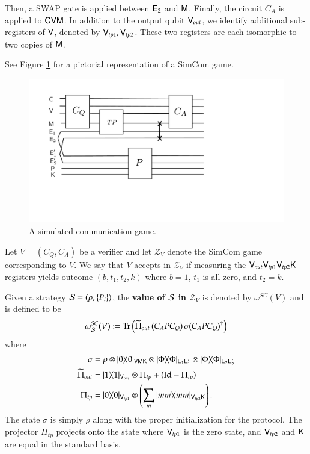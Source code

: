 Then, a SWAP gate is applied between ${\mathsf{E}}_2$ and ${\mathsf{M}}$. Finally, the circuit $C_A$ is applied to ${\mathsf{C}} {\mathsf{V}} {\mathsf{M}}$. In addition to the output qubit ${\mathsf{V}}_{out}$, we identify additional sub-registers of ${\mathsf{V}}$, denoted by ${\mathsf{V}}_{tp1},{\mathsf{V}}_{tp2}$. These two registers are each isomorphic to two copies of ${\mathsf{M}}$.


See Figure \ref{fig:simcom} for a pictorial representation of a SimCom game.


\begin{figure}[H]
\begin{center}
\includegraphics[width=5in]{graphics/simcom.pdf}
\end{center}
\caption{A simulated communication game.}
\label{fig:simcom}
\end{figure}

Let $V = (C_Q,C_A)$ be a verifier and let $\mathscr{Z}_V$ denote the SimCom game corresponding to $V$. We say that $V$ accepts in $\mathscr{Z}_V$ if measuring the ${\mathsf{V}}_{out} {\mathsf{V}}_{tp1} {\mathsf{V}}_{tp2} {\mathsf{K}}$ registers yields outcome $(b,t_1,t_2,k)$ where $b = 1$, $t_1$ is all zero,
and $t_2 = k$. 

Given a strategy $\mathcal{S} = (\rho,\{P_i\})$, the \textbf{value of $\mathcal{S}$ in $\mathscr{Z}_V$} is denoted by $\omega^{SC}(V)$ and is defined to be
\[
	\omega^{SC}_{\mathcal{S}}(V) := \operatorname{Tr} \left( \widetilde{\Pi}_{out} \, ( C_A P C_Q) \, \sigma(C_A P C_Q)^\dagger\right)
\]
where
\begin{align*}
\sigma &= \rho \otimes |0\rangle\! \langle 0|_{{\mathsf{V}} {\mathsf{M}} {\mathsf{K}}} \otimes |\Phi\rangle\! \langle \Phi|_{{\mathsf{E}}_1 {\mathsf{E}}_1'} \otimes |\Phi\rangle\! \langle \Phi|_{{\mathsf{E}}_2 {\mathsf{E}}_2'} \\
	\widetilde{\Pi}_{out} &= |1\rangle\! \langle 1|_{{\mathsf{V}}_{out}} \otimes \Pi_{tp} + (\mathop{\mathrm{Id}}\!\mathinner{} - \Pi_{tp}) \\
	\Pi_{tp} &= |0\rangle\! \langle 0|_{{\mathsf{V}}_{tp1}} \otimes \left( \sum_{m} |mm\rangle\! \langle mm|_{{\mathsf{V}}_{tp2} {\mathsf{K}}}\right).
\end{align*}
The state $\sigma$ is simply $\rho$ along with the proper initialization for the protocol. The projector $\Pi_{tp}$ projects onto the state where ${\mathsf{V}}_{tp1}$ is the zero state, and ${\mathsf{V}}_{tp2}$ and ${\mathsf{K}}$ are equal in the standard basis.

